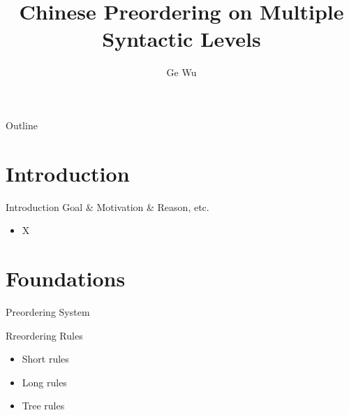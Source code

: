 \documentclass[18pt]{beamer}
\title{Chinese Preordering on Multiple Syntactic Levels}
\subtitle{}
\author{Ge Wu}
\institute{Institute for Anthropomatics and Robotics (IAR)}
\begin{document}

\begin{frame}
\titlepage
\end{frame}

\begin{frame}{Outline}
\tableofcontents
\end{frame}

\section{Introduction}
\begin{frame}{Introduction}
Goal \& Motivation \& Reason, etc.
\begin{itemize}
\item X
\end{itemize}
\end{frame}

\section{Foundations}

\begin{frame}{Preordering System}
\begin{figure}
\centering

\label{prereordering}
\end{figure}
\end{frame}


\begin{frame}{Rreordering Rules}
\begin{itemize}
\item Short rules
\item Long rules
\item Tree rules
\end{itemize}
\end{frame}
\end{document}
